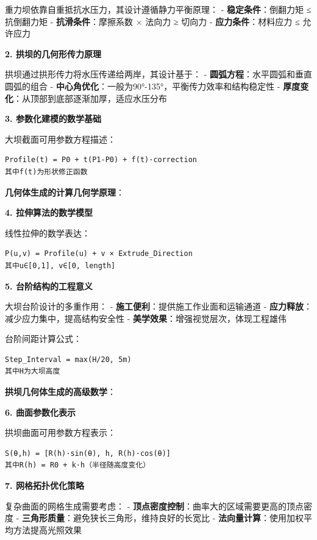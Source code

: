 重力坝依靠自重抵抗水压力，其设计遵循静力平衡原理： - \textbf{稳定条件}：倒翻力矩 ≤ 抗倒翻力矩 - \textbf{抗滑条件}：摩擦系数 × 法向力 ≥ 切向力 - \textbf{应力条件}：材料应力 ≤ 允许应力

\textbf{2. 拱坝的几何形传力原理}

拱坝通过拱形传力将水压传递给两岸，其设计基于： - \textbf{圆弧方程}：水平圆弧和垂直圆弧的组合 - \textbf{中心角优化}：一般为90°-135°，平衡传力效率和结构稳定性 - \textbf{厚度变化}：从顶部到底部逐渐加厚，适应水压分布

\textbf{3. 参数化建模的数学基础}

大坝截面可用参数方程描述：

\begin{verbatim}
Profile(t) = P0 + t(P1-P0) + f(t)·correction
其中f(t)为形状修正函数
\end{verbatim}

\textbf{几何体生成的计算几何学原理}：

\textbf{4. 拉伸算法的数学模型}

线性拉伸的数学表达：

\begin{verbatim}
P(u,v) = Profile(u) + v × Extrude_Direction
其中u∈[0,1], v∈[0, length]
\end{verbatim}

\textbf{5. 台阶结构的工程意义}

大坝台阶设计的多重作用： - \textbf{施工便利}：提供施工作业面和运输通道 - \textbf{应力释放}：减少应力集中，提高结构安全性 - \textbf{美学效果}：增强视觉层次，体现工程雄伟

台阶间距计算公式：

\begin{verbatim}
Step_Interval = max(H/20, 5m)
其中H为大坝高度
\end{verbatim}

\textbf{拱坝几何体生成的高级数学}：

\textbf{6. 曲面参数化表示}

拱坝曲面可用参数方程表示：

\begin{verbatim}
S(θ,h) = [R(h)·sin(θ), h, R(h)·cos(θ)]
其中R(h) = R0 + k·h（半径随高度变化）
\end{verbatim}

\textbf{7. 网格拓扑优化策略}

复杂曲面的网格生成需要考虑： - \textbf{顶点密度控制}：曲率大的区域需要更高的顶点密度 - \textbf{三角形质量}：避免狭长三角形，维持良好的长宽比 - \textbf{法向量计算}：使用加权平均方法提高光照效果

